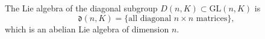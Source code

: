 The Lie algebra of the diagonal subgroup $D(n, K) \subset \mathrm{GL}(n, K)$ is
$$\mathfrak{d}(n, K) = \{\text{all diagonal } n \times n \text{ matrices}\},$$
which is an abelian Lie algebra of dimension $n$.
